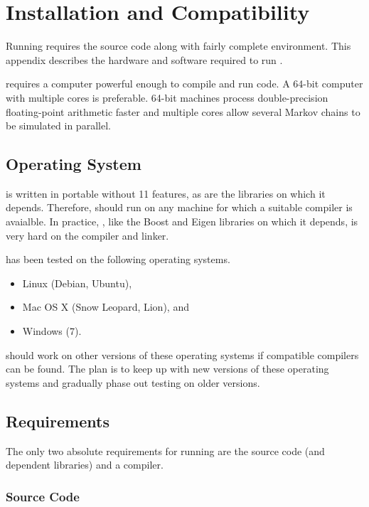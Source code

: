 \chapter{Installation and Compatibility}\label{install.appendix}

Running \Stan requires the \Stan source code along with fairly
complete \Cpp environment.  This appendix describes the hardware and
software required to run \Stan.  

\Stan requires a computer powerful enough to compile and run \Cpp
code.  A 64-bit computer with multiple cores is preferable.  64-bit
machines process double-precision floating-point arithmetic faster and
multiple cores allow several Markov chains to be simulated in parallel.

\section{Operating System}

\Stan is written in portable \Cpp without {\Cpp}11 features, as are the
libraries on which it depends.  Therefore, \Stan should run on any machine
for which a suitable \Cpp compiler is avaialble.  In practice, \Stan,
like the Boost and Eigen libraries on which it depends, is very hard
on the compiler and linker.

\Stan has been tested on the following operating systems.
%
\begin{itemize}
\item Linux (Debian, Ubuntu), 
\item Mac OS X (Snow Leopard, Lion), and
\item Windows (7).
\end{itemize}
%
\Stan should work on other versions of these operating systems if
compatible \Cpp compilers can be found.  The plan is to keep up with
new versions of these operating systems and gradually phase out
testing on older versions.


\section{Requirements}

The only two absolute requirements for running \Stan are the
\Stan source code (and dependent libraries) and a \Cpp compiler.

\subsection{Source Code}

